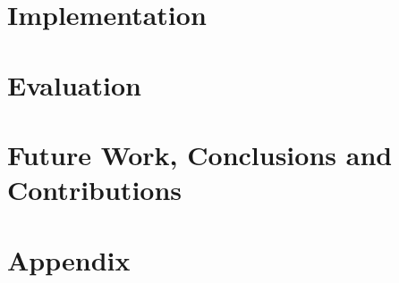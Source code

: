 \documentclass[12pt,twoside]{report}
\begin{document}
\chapter{Implementation}

\label{sect:overview}

\label{sect:buildsystem}

\label{sect:renderer}

\label{sect:tracker}

\label{sect:userstudy}

\chapter{Evaluation}
 
\label{sect:eval-volsim}

\label{sect:eval-userstudy}

\chapter{Future Work, Conclusions and Contributions}

\label{sect:conclusions}

\printbibliography

\appendix
\chapter{Appendix}



\end{document}
